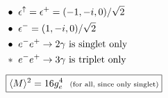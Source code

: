 \documentclass{article}
\begin{document}
\)
\quad \vline \quad
\(
    \begin{aligned}
        & \bullet\ \epsilon^\uparrow = \epsilon^+ = (-1, -i, 0) / \sqrt{2} \\
        & \bullet\ \epsilon^- = (1, -i, 0) / \sqrt{2} \\
        & \bullet\ e^- e^+ \rightarrow 2\gamma \ \text{is singlet only}\\
        & \ast\ e^- e^+ \rightarrow 3\gamma \ \text{is triplet only}
            \\[5pt]
        & \boxed{ \langle M \rangle^2 = 16g_e^4 \ \ \text{\scriptsize(for all, since only singlet)} }
    \end{aligned}
\)
\end{document}
